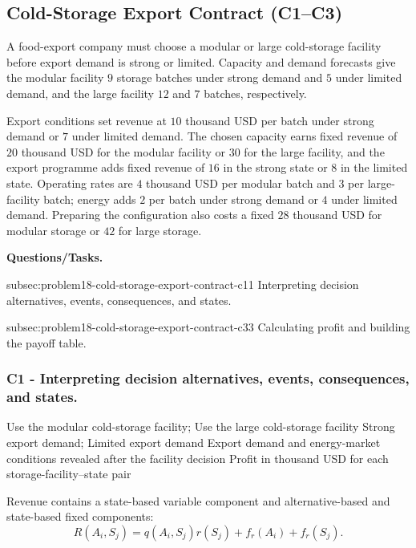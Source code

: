 	\subsection{Cold-Storage Export Contract (C1--C3)}
	\label{sec:problem18-cold-storage-export-contract-c1-c3}

	A food-export company must choose a modular or large cold-storage facility before export demand is strong or limited. Capacity and demand forecasts give the modular facility \(9\) storage batches under strong demand and \(5\) under limited demand, and the large facility \(12\) and \(7\) batches, respectively.

	Export conditions set revenue at \(10\) thousand USD per batch under strong demand or \(7\) under limited demand. The chosen capacity earns fixed revenue of \(20\) thousand USD for the modular facility or \(30\) for the large facility, and the export programme adds fixed revenue of \(16\) in the strong state or \(8\) in the limited state. Operating rates are \(4\) thousand USD per modular batch and \(3\) per large-facility batch; energy adds \(2\) per batch under strong demand or \(4\) under limited demand. Preparing the configuration also costs a fixed \(28\) thousand USD for modular storage or \(42\) for large storage.

	\textbf{Questions/Tasks.}
	\begin{enumerate}
		\CriterionTask
		{subsec:problem18-cold-storage-export-contract-c1}{1}
		{Interpreting decision alternatives, events, consequences, and states.}

		\CriterionTask
		{subsec:problem18-cold-storage-export-contract-c3}{3}
		{Calculating profit and building the payoff table.}
	\end{enumerate}

	\subsubsection*{C1 - Interpreting decision alternatives, events, consequences, and states.}
	\label{subsec:problem18-cold-storage-export-contract-c1}

	\DecisionElementsTable
	{Use the modular cold-storage facility; Use the large cold-storage facility}
	{Strong export demand; Limited export demand}
	{Export demand and energy-market conditions revealed after the facility decision}
	{Profit in thousand USD for each storage-facility--state pair}

	Revenue contains a state-based variable component and alternative-based and
	state-based fixed components:
	\[
	R(A_i,S_j)
	=
	q(A_i,S_j)r(S_j)
	+
	f_r(A_i)
	+
	f_r(S_j).
	\]

